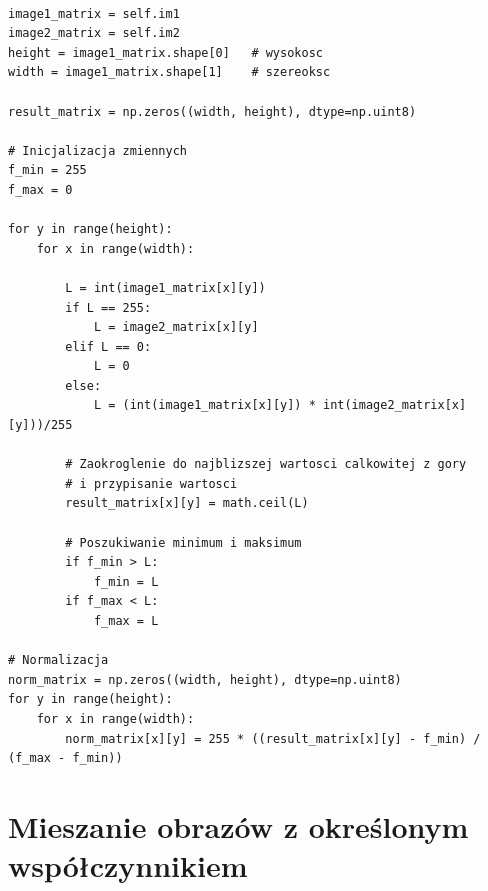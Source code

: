\documentclass[final,a4paper,openany,12pt]{mwbk}
\begin{document}
\begin{lstlisting}[caption=Mnożenie obrazu szarego przez inny obraz ]

image1_matrix = self.im1
image2_matrix = self.im2
height = image1_matrix.shape[0]   # wysokosc
width = image1_matrix.shape[1]    # szereoksc

result_matrix = np.zeros((width, height), dtype=np.uint8)

# Inicjalizacja zmiennych
f_min = 255
f_max = 0

for y in range(height):
    for x in range(width):  

        L = int(image1_matrix[x][y]) 
        if L == 255:
            L = image2_matrix[x][y]
        elif L == 0:
            L = 0
        else:
            L = (int(image1_matrix[x][y]) * int(image2_matrix[x][y]))/255 

        # Zaokroglenie do najblizszej wartosci calkowitej z gory
        # i przypisanie wartosci
        result_matrix[x][y] = math.ceil(L)
                        
        # Poszukiwanie minimum i maksimum
        if f_min > L:
            f_min = L
        if f_max < L:
            f_max = L

# Normalizacja
norm_matrix = np.zeros((width, height), dtype=np.uint8)
for y in range(height):
    for x in range(width):
        norm_matrix[x][y] = 255 * ((result_matrix[x][y] - f_min) / (f_max - f_min))

\end{lstlisting}

\section {Mieszanie obrazów z określonym współczynnikiem}
\end{document}
